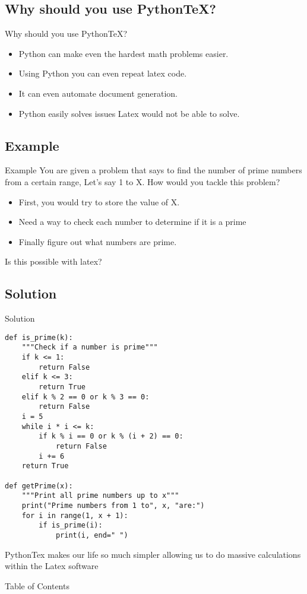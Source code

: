 \documentclass[pdf]{beamer}
\begin{document}
\subsection{Why should you use PythonTeX?}
\begin{frame}{Why should you use PythonTeX?}
\begin{itemize}
 \item{Python can make even the hardest math problems easier. }
 \item{Using Python you can even repeat latex code.}
 \item{It can even automate document generation.}
 \item {Python easily solves issues Latex would not be able to solve.}
\end{itemize}
\end{frame}
\subsection{Example}
\begin{frame}{Example}
You are given a problem that says to find the number of prime numbers from a certain range, Let's say 1 to X. How would you tackle this problem?
\begin{itemize}
 \item{First, you would try to store the value of X.}
 \item{Need a way to check each number to determine if it is a prime}
 \item{Finally figure out what numbers are prime.}
\end{itemize}
Is this possible with latex?
\end{frame}
\subsection{Solution}
\begin{frame}[fragile]{Solution}
\begin{lstlisting}[caption={Finding the Prime Numbers}, basicstyle=\tiny]
def is_prime(k):
    """Check if a number is prime"""
    if k <= 1:
        return False
    elif k <= 3:
        return True
    elif k % 2 == 0 or k % 3 == 0:
        return False
    i = 5
    while i * i <= k:
        if k % i == 0 or k % (i + 2) == 0:
            return False
        i += 6
    return True

def getPrime(x):
    """Print all prime numbers up to x"""
    print("Prime numbers from 1 to", x, "are:")
    for i in range(1, x + 1):
        if is_prime(i):
            print(i, end=" ")
\end{lstlisting}
PythonTex makes our life so much simpler allowing us to do massive calculations within the Latex software
\end{frame}
\begin{frame}{Table of Contents}
 \tableofcontents
\end{frame}
\end{document}

